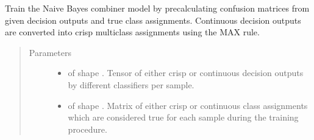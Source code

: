 \documentclass[letterpaper,10pt,english]{sphinxmanual}
\begin{document}
\begin{fulllineitems}
\begin{fulllineitems}
\begin{quote}
\begin{description}
\end{description}\end{quote}

\end{fulllineitems}


\begin{fulllineitems}
\label{\detokenize{pusion.core.naive_bayes_combiner:pusion.core.naive_bayes_combiner.NaiveBayesCombiner.train}}
\sphinxAtStartPar
Train the Naive Bayes combiner model by precalculating confusion matrices from given decision outputs and
true class assignments. Continuous decision outputs are converted into crisp multiclass assignments using
the MAX rule.
\begin{quote}\begin{description}
\item[{Parameters}] \leavevmode\begin{itemize}
\item {} 
\sphinxAtStartPar
{} \textendash{}  of shape .
Tensor of either crisp or continuous decision outputs by different classifiers per sample.

\item {} 
\sphinxAtStartPar
{} \textendash{}  of shape .
Matrix of either crisp or continuous class assignments which are considered true for each sample during
the training procedure.

\end{itemize}

\end{description}\end{quote}

\end{fulllineitems}



\end{fulllineitems}
\end{document}

